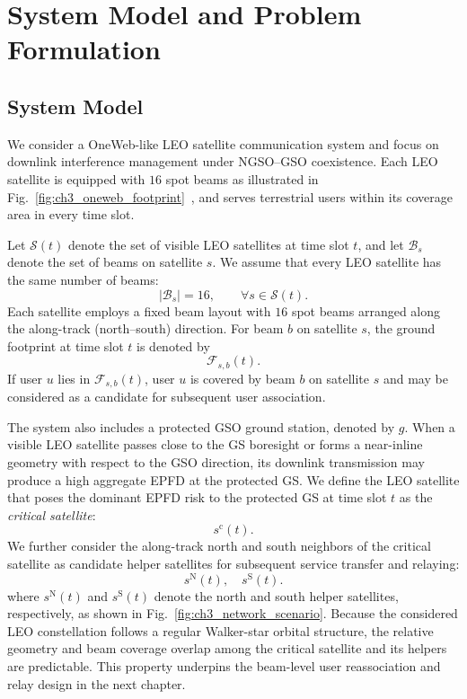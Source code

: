 

\section{System Model and Problem Formulation}
\label{sec:system_model}

\subsection{System Model}

We consider a OneWeb-like LEO satellite communication system and focus on downlink interference management under NGSO--GSO coexistence. Each LEO satellite is equipped with $16$ spot beams as illustrated in Fig.~\ref{fig:ch3_oneweb_footprint}~\cite{oneweb2016fcc}, and serves terrestrial users within its coverage area in every time slot.

Let $\mathcal{S}(t)$ denote the set of visible LEO satellites at time slot $t$, and let $\mathcal{B}_s$ denote the set of beams on satellite $s$. We assume that every LEO satellite has the same number of beams:
\begin{equation*}
|\mathcal{B}_s|=16,\qquad \forall s\in\mathcal{S}(t).
\end{equation*}
Each satellite employs a fixed beam layout with $16$ spot beams arranged along the along-track (north--south) direction. For beam $b$ on satellite $s$, the ground footprint at time slot $t$ is denoted by
\begin{equation*}
\mathcal{F}_{s,b}(t).
\end{equation*}
If user $u$ lies in $\mathcal{F}_{s,b}(t)$, user $u$ is covered by beam $b$ on satellite $s$ and may be considered as a candidate for subsequent user association.

The system also includes a protected GSO ground station, denoted by $g$. When a visible LEO satellite passes close to the GS boresight or forms a near-inline geometry with respect to the GSO direction, its downlink transmission may produce a high aggregate EPFD at the protected GS. We define the LEO satellite that poses the dominant EPFD risk to the protected GS at time slot $t$ as the \emph{critical satellite}:
\begin{equation*}
s^{\mathrm{c}}(t).
\end{equation*}
We further consider the along-track north and south neighbors of the critical satellite as candidate helper satellites for subsequent service transfer and relaying:
\begin{equation*}
s^{\mathrm{N}}(t),\quad s^{\mathrm{S}}(t).
\end{equation*}
where $s^{\mathrm{N}}(t)$ and $s^{\mathrm{S}}(t)$ denote the north and south helper satellites, respectively, as shown in Fig.~\ref{fig:ch3_network_scenario}. Because the considered LEO constellation follows a regular Walker-star orbital structure, the relative geometry and beam coverage overlap among the critical satellite and its helpers are predictable. This property underpins the beam-level user reassociation and relay design in the next chapter.

